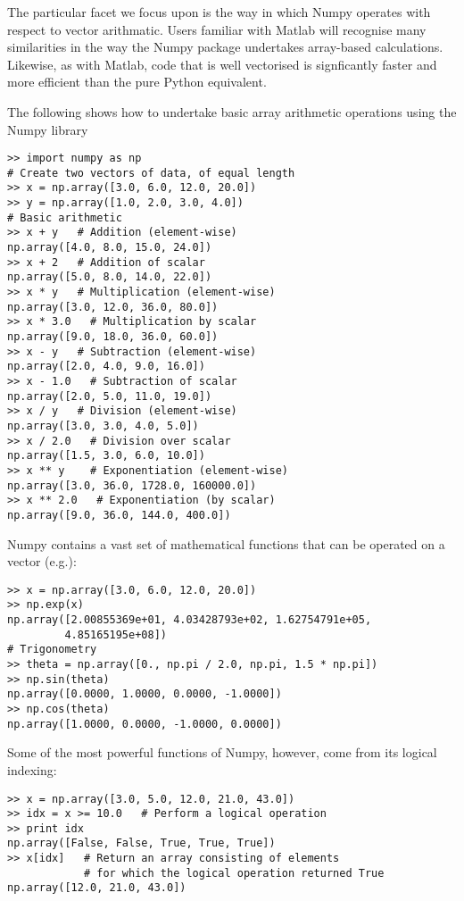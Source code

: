 The particular facet we focus upon is the way in which Numpy operates with respect to vector arithmatic. Users familiar with Matlab will recognise many similarities in the way the Numpy package undertakes array-based calculations. Likewise, as with Matlab, code that is well vectorised is signficantly faster and more efficient than the pure Python equivalent. 

The following shows how to undertake basic array arithmetic operations using the Numpy library

\begin{lstlisting}[frame=single]
>> import numpy as np
# Create two vectors of data, of equal length
>> x = np.array([3.0, 6.0, 12.0, 20.0])
>> y = np.array([1.0, 2.0, 3.0, 4.0])
# Basic arithmetic
>> x + y   # Addition (element-wise)
np.array([4.0, 8.0, 15.0, 24.0])
>> x + 2   # Addition of scalar
np.array([5.0, 8.0, 14.0, 22.0])
>> x * y   # Multiplication (element-wise)
np.array([3.0, 12.0, 36.0, 80.0])
>> x * 3.0   # Multiplication by scalar
np.array([9.0, 18.0, 36.0, 60.0])
>> x - y   # Subtraction (element-wise)
np.array([2.0, 4.0, 9.0, 16.0])
>> x - 1.0   # Subtraction of scalar
np.array([2.0, 5.0, 11.0, 19.0])
>> x / y   # Division (element-wise)
np.array([3.0, 3.0, 4.0, 5.0])
>> x / 2.0   # Division over scalar
np.array([1.5, 3.0, 6.0, 10.0])
>> x ** y    # Exponentiation (element-wise)
np.array([3.0, 36.0, 1728.0, 160000.0])
>> x ** 2.0   # Exponentiation (by scalar)
np.array([9.0, 36.0, 144.0, 400.0])
\end{lstlisting}

Numpy contains a vast set of mathematical functions that can be operated on a vector (e.g.):

\begin{lstlisting}[frame=single]
>> x = np.array([3.0, 6.0, 12.0, 20.0])
>> np.exp(x)
np.array([2.00855369e+01, 4.03428793e+02, 1.62754791e+05,
         4.85165195e+08])
# Trigonometry
>> theta = np.array([0., np.pi / 2.0, np.pi, 1.5 * np.pi])
>> np.sin(theta)
np.array([0.0000, 1.0000, 0.0000, -1.0000])
>> np.cos(theta)
np.array([1.0000, 0.0000, -1.0000, 0.0000])
\end{lstlisting}

Some of the most powerful functions of Numpy, however, come from its logical indexing:

\begin{lstlisting}[frame=single]
>> x = np.array([3.0, 5.0, 12.0, 21.0, 43.0])
>> idx = x >= 10.0   # Perform a logical operation
>> print idx
np.array([False, False, True, True, True])
>> x[idx]   # Return an array consisting of elements
            # for which the logical operation returned True
np.array([12.0, 21.0, 43.0])
\end{lstlisting}

